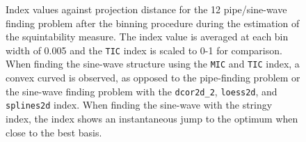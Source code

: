 \documentclass[
  number,
  preprint,
  3p]{elsarticle}
\begin{document}
\endgroup{}

\begin{figure}


\caption{\label{fig-idx-proj-dist}Index values against projection
distance for the 12 pipe/sine-wave finding problem after the binning
procedure during the estimation of the squintability measure. The index
value is averaged at each bin width of 0.005 and the \texttt{TIC} index
is scaled to 0-1 for comparison. When finding the sine-wave structure
using the \texttt{MIC} and \texttt{TIC} index, a convex curved is
observed, as opposed to the pipe-finding problem or the sine-wave
finding problem with the \texttt{dcor2d\_2}, \texttt{loess2d}, and
\texttt{splines2d} index. When finding the sine-wave with the stringy
index, the index shows an instantaneous jump to the optimum when close
to the best basis.}

\end{figure}%
\end{document}
